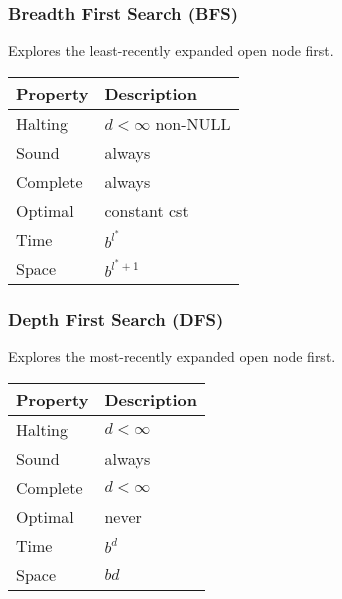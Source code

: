 \subsubsection{Breadth First Search (BFS)}
\begin{definition}
    Explores the least-recently expanded open node first.
    \begin{center}
        \begin{tabular}{|p{3cm}|p{3cm}|}
        \hline
        \textbf{Property} & \textbf{Description} \\ \hline
        Halting & $d < \infty$ \newline non-NULL \\ \hline
        Sound & always \\ \hline
        Complete & always \\ \hline
        Optimal & constant cst \\ \hline
        Time & $b^{l^*}$ \\ \hline
        Space & $b^{l^* + 1}$ \\ \hline
        \end{tabular}
    \end{center}
\end{definition}

\subsubsection{Depth First Search (DFS)}
\begin{definition}
    Explores the most-recently expanded open node first.
    \begin{center}
        \begin{tabular}{|p{3cm}|p{3cm}|}
        \hline
        \textbf{Property} & \textbf{Description} \\ \hline
        Halting & $d < \infty$ \\ \hline
        Sound & always \\ \hline
        Complete & $d < \infty$ \\ \hline
        Optimal & never \\ \hline
        Time & $b^d$ \\ \hline
        Space & $bd$ \\ \hline
        \end{tabular}
    \end{center}    
\end{definition}

